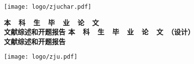 \thispagestyle{empty}
\setcounter{page}{-1}

\hskip 40mm

\begin{center}
    \texttt{[image: logo/zjuchar.pdf]}
\end{center}

\begin{center}
     \heiti \bfseries
    {
        本~~科~~生~~毕~~业~~论~~文
        \\ \vskip 24pt
        文献综述和开题报告
    }
    {
        本~~科~~生~~毕~~业~~论~~文~（设计）
        \\ \vskip 24pt
        文献综述和开题报告
    }
\end{center}

\vskip 40pt

\begin{center}
    \texttt{[image: logo/zju.pdf]}
\end{center}

